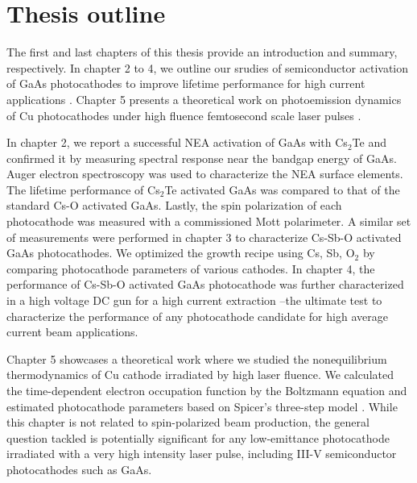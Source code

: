 \section{Thesis outline}

The first and last chapters of this thesis provide an introduction and summary, respectively. In chapter 2 to 4, we outline our srudies of semiconductor activation of GaAs photocathodes to improve lifetime performance for high current applications \cite{bae2018_RuggedSpinpolarizedElectron,bae2020_ImprovedLifetimeHigh, bae2022}. Chapter 5 presents a theoretical work on photoemission dynamics of Cu photocathodes under high fluence femtosecond scale laser pulses \cite{bae2018_BrightnessFemtosecondNonequilibrium}.


In chapter 2, we report a successful NEA activation of GaAs with Cs$_2$Te and confirmed it by measuring spectral response near the bandgap energy of GaAs.
Auger electron spectroscopy was used to characterize the NEA surface elements.
The lifetime performance of Cs$_2$Te activated GaAs was compared to that of the standard Cs-O activated GaAs.
Lastly, the spin polarization of each photocathode was measured with a commissioned Mott polarimeter.
A similar set of measurements were performed in chapter 3 to characterize Cs-Sb-O activated GaAs photocathodes.
We optimized the growth recipe using Cs, Sb, O$_2$ by comparing photocathode parameters of various cathodes.
In chapter 4, the performance of Cs-Sb-O activated GaAs photocathode was further characterized in a high voltage DC gun for a high current extraction --the ultimate test to characterize the performance of any photocathode candidate for high average current beam applications.

Chapter 5 showcases a theoretical work where we studied the nonequilibrium thermodynamics of Cu cathode irradiated by high laser fluence. We calculated the time-dependent electron occupation function by the Boltzmann equation and estimated photocathode parameters based on Spicer's three-step model \cite{spicer1964}.
While this chapter is not related to spin-polarized beam production, the general question tackled is potentially significant for any low-emittance photocathode irradiated with a very high intensity laser pulse, including III-V semiconductor photocathodes such as GaAs.
